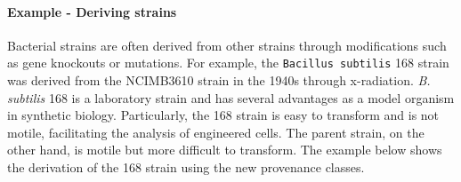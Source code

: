\paragraph{Example - Deriving strains}

Bacterial strains are often derived from other strains through modifications such as gene knockouts or mutations. For example, the \texttt{Bacillus subtilis} 168 strain was derived from the NCIMB3610 strain in the 1940s through x-radiation. \textit{B. subtilis} 168 is a laboratory strain and has several advantages as a model organism in synthetic biology. Particularly, the 168 strain is easy to transform and is not motile, facilitating the analysis of engineered cells. The parent strain, on the other hand, is motile but more difficult to transform. The example below shows the derivation of the 168 strain using the new provenance classes.



